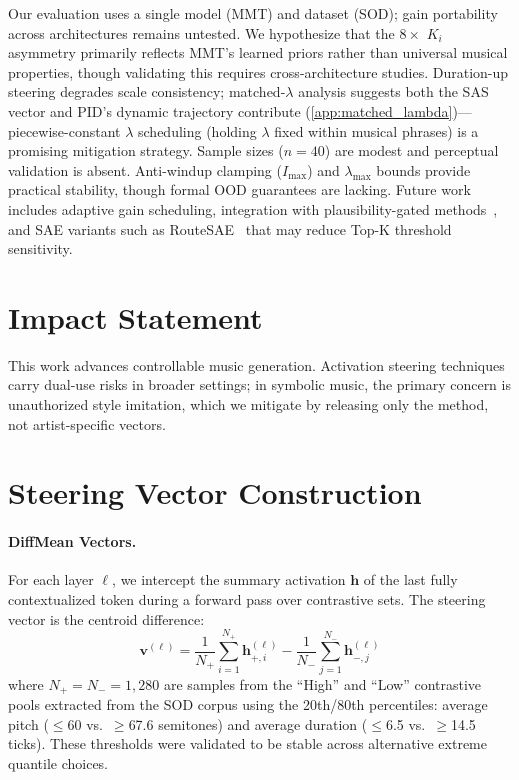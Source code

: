 \documentclass{article}
\theoremstyle{plain}
\begin{document}
Our evaluation uses a single model (MMT) and dataset (SOD); gain portability across architectures remains untested. We hypothesize that the $8{\times}$ $K_i$ asymmetry primarily reflects MMT's learned priors rather than universal musical properties, though validating this requires cross-architecture studies. Duration-up steering degrades scale consistency; matched-$\lambda$ analysis suggests both the SAS vector and PID's dynamic trajectory contribute (\cref{app:matched_lambda})---piecewise-constant $\lambda$ scheduling (holding $\lambda$ fixed within musical phrases) is a promising mitigation strategy. Sample sizes ($n{=}40$) are modest and perceptual validation is absent. Anti-windup clamping ($I_\text{max}$) and $\lambda_\text{max}$ bounds provide practical stability, though formal OOD guarantees are lacking. Future work includes adaptive gain scheduling, integration with plausibility-gated methods~\cite{kang2026directer}, and SAE variants such as RouteSAE~\cite{shi2025routesae} that may reduce Top-K threshold sensitivity.

\section*{Impact Statement}
This work advances controllable music generation. Activation steering techniques carry dual-use risks in broader settings; in symbolic music, the primary concern is unauthorized style imitation, which we mitigate by releasing only the method, not artist-specific vectors.




\newpage
\appendix

\section{Steering Vector Construction}
\label{app:vector_construction}

\paragraph{DiffMean Vectors.}
For each layer $\ell$, we intercept the summary activation $\mathbf{h}$ of the last fully contextualized token during a forward pass over contrastive sets. The steering vector is the centroid difference:
\begin{equation}
    \mathbf{v}^{(\ell)} = \frac{1}{N_+}\sum_{i=1}^{N_+}\mathbf{h}^{(\ell)}_{+,i} - \frac{1}{N_-}\sum_{j=1}^{N_-}\mathbf{h}^{(\ell)}_{-,j}
\end{equation}
where $N_+ = N_- = 1{,}280$ are samples from the ``High'' and ``Low'' contrastive pools extracted from the SOD corpus using the 20th/80th percentiles: average pitch ($\leq$60 vs.\ $\geq$67.6 semitones) and average duration ($\leq$6.5 vs.\ $\geq$14.5 ticks). These thresholds were validated to be stable across alternative extreme quantile choices.
\end{document}
